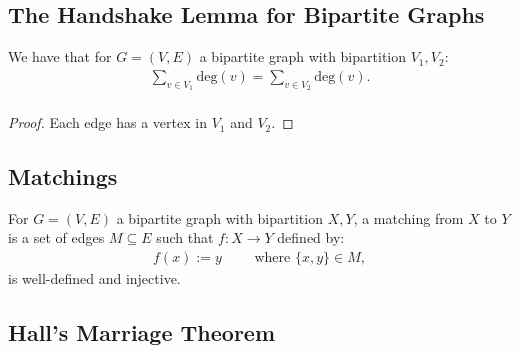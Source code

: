 \subsection{The Handshake Lemma for Bipartite Graphs}

We have that for $G = (V, E)$ a bipartite graph with bipartition
$V_1, V_2$: \begin{gather*}
  \sum_{v \in V_1} \text{deg}(v) = \sum_{v \in V_2} \text{deg}(v). \\
\end{gather*}
\begin{proof}
    Each edge has a vertex in $V_1$ and $V_2$.
\end{proof}

\subsection{Matchings}

For $G = (V, E)$ a bipartite graph with bipartition $X, Y$,
a matching from $X$ to $Y$ is a set of edges $M \subseteq E$
such that $f : X \to Y$ defined by: \begin{gather*}
  f(x) := y \qquad \text{ where } \{x, y\} \in M,
\end{gather*} is well-defined and injective.

\subsection{Hall's Marriage Theorem} \label{halls}

